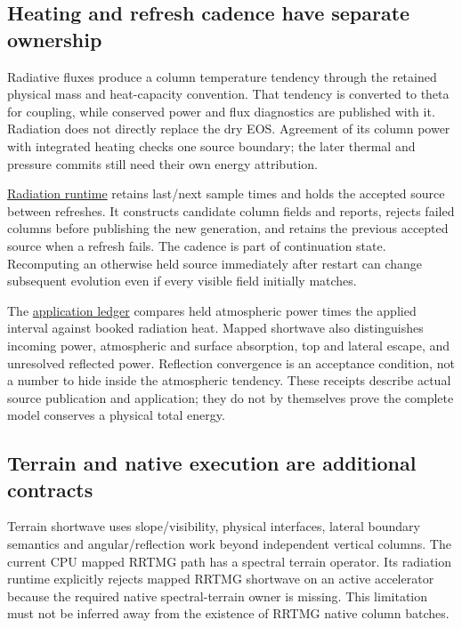 \subsection{Heating and refresh cadence have separate ownership}

Radiative fluxes produce a column temperature tendency through the retained
physical mass and heat-capacity convention. That tendency is converted to
theta for coupling, while conserved power and flux diagnostics are published
with it. Radiation does not directly replace the dry EOS. Agreement of its
column power with integrated heating checks one source boundary; the later
thermal and pressure commits still need their own energy attribution.

\href{../src/radiation/runtime.cpp}{Radiation runtime} retains last/next sample
times and holds the accepted source between refreshes. It constructs candidate
column fields and reports, rejects failed columns before publishing the new
generation, and retains the previous accepted source when a refresh fails.
The cadence is part of continuation state. Recomputing an otherwise held source
immediately after restart can change subsequent evolution even if every visible
field initially matches.

The \href{../src/radiation/energy_ledger.cpp}{application ledger} compares
held atmospheric power times the applied interval against booked radiation
heat. Mapped shortwave also distinguishes incoming power, atmospheric and
surface absorption, top and lateral escape, and unresolved reflected power.
Reflection convergence is an acceptance condition, not a number to hide inside
the atmospheric tendency. These receipts describe actual source publication
and application; they do not by themselves prove the complete model conserves
a physical total energy.

\subsection{Terrain and native execution are additional contracts}

Terrain shortwave uses slope/visibility, physical interfaces, lateral boundary
semantics and angular/reflection work beyond independent vertical columns.
The current CPU mapped RRTMG path has a spectral terrain operator. Its radiation
runtime explicitly rejects mapped RRTMG shortwave on an active accelerator
because the required native spectral-terrain owner is missing. This limitation
must not be inferred away from the existence of RRTMG native column batches.

